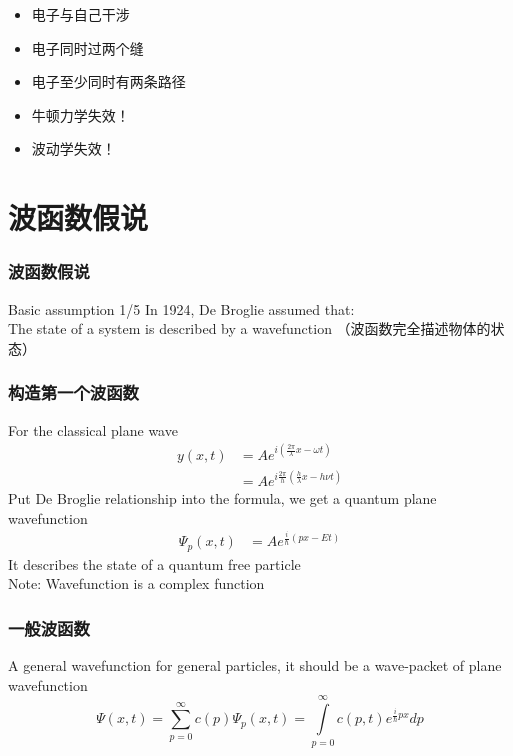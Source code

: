 \begin{frame}
\begin{itemize}
    \item  电子与自己干涉 
    \item  电子同时过两个缝  
    \item  电子至少同时有两条路径 
    \item  牛顿力学失效！ 
    \item  波动学失效！ 
\end{itemize}
\end{frame}

\section{波函数假说}

\begin{frame}
    \frametitle{波函数假说}
    \begin{tcolorbox1}{Basic assumption 1/5}
    In 1924, De Broglie assumed that:\\
    The state of a system is described by a wavefunction （波函数完全描述物体的状态）
    \end{tcolorbox1}
\end{frame}

\begin{frame}
    \frametitle{构造第一个波函数}
        For the classical plane wave
        \begin{equation*}
            \begin{split}
                y(x,t)&=A e^{i(\frac{2\pi}{\lambda}x-\omega t)} \\
                    & = A e^{i\frac{2\pi}{h}(\frac{h}{\lambda}x-h\nu t)}
            \end{split} 
        \end{equation*}
        Put De Broglie relationship into the formula, we get a quantum plane wavefunction
        \begin{equation*}
            \begin{split}
                \Psi_p(x,t)&=A e^{\frac{i}{\hbar}(px-Et)}
            \end{split} 
         \end{equation*}
         It describes the state of a quantum free particle\\
         Note: Wavefunction is a complex function 
\end{frame}

\begin{frame}
    \frametitle{一般波函数}
         A general wavefunction for general particles, it should be a wave-packet of plane wavefunction
         \begin{equation*}
                \Psi(x,t)=\sum\limits_{p=0} ^{\infty} c(p)\Psi_p(x,t) = \int\limits_{p=0} ^{\infty} c(p,t) e^{\frac{i}{\hbar}px}dp
         \end{equation*}
\end{frame}


